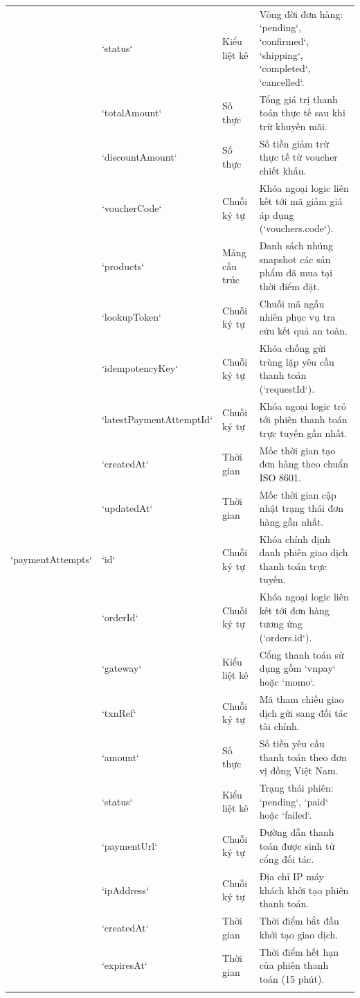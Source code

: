 \begin{table}[H]
\begin{tabularx}{\textwidth}{p{2.5cm}p{2.3cm}p{1.8cm}X}
& `status` & Kiểu liệt kê & Vòng đời đơn hàng: `pending`, `confirmed`, `shipping`, `completed`, `cancelled`. \\
& `totalAmount` & Số thực & Tổng giá trị thanh toán thực tế sau khi trừ khuyến mãi. \\
& `discountAmount` & Số thực & Số tiền giảm trừ thực tế từ voucher chiết khấu. \\
& `voucherCode` & Chuỗi ký tự & Khóa ngoại logic liên kết tới mã giảm giá áp dụng (`vouchers.code`). \\
& `products` & Mảng cấu trúc & Danh sách nhúng snapshot các sản phẩm đã mua tại thời điểm đặt. \\
& `lookupToken` & Chuỗi ký tự & Chuỗi mã ngẫu nhiên phục vụ tra cứu kết quả an toàn. \\
& `idempotencyKey` & Chuỗi ký tự & Khóa chống gửi trùng lặp yêu cầu thanh toán (`requestId`). \\
& `latestPaymentAttemptId` & Chuỗi ký tự & Khóa ngoại logic trỏ tới phiên thanh toán trực tuyến gần nhất. \\
& `createdAt` & Thời gian & Mốc thời gian tạo đơn hàng theo chuẩn ISO 8601. \\
& `updatedAt` & Thời gian & Mốc thời gian cập nhật trạng thái đơn hàng gần nhất. \\
\addlinespace
`paymentAttempts` & `id` & Chuỗi ký tự & Khóa chính định danh phiên giao dịch thanh toán trực tuyến. \\
& `orderId` & Chuỗi ký tự & Khóa ngoại logic liên kết tới đơn hàng tương ứng (`orders.id`). \\
& `gateway` & Kiểu liệt kê & Cổng thanh toán sử dụng gồm `vnpay` hoặc `momo`. \\
& `txnRef` & Chuỗi ký tự & Mã tham chiếu giao dịch gửi sang đối tác tài chính. \\
& `amount` & Số thực & Số tiền yêu cầu thanh toán theo đơn vị đồng Việt Nam. \\
& `status` & Kiểu liệt kê & Trạng thái phiên: `pending`, `paid` hoặc `failed`. \\
& `paymentUrl` & Chuỗi ký tự & Đường dẫn thanh toán được sinh từ cổng đối tác. \\
& `ipAddress` & Chuỗi ký tự & Địa chỉ IP máy khách khởi tạo phiên thanh toán. \\
& `createdAt` & Thời gian & Thời điểm bắt đầu khởi tạo giao dịch. \\
& `expiresAt` & Thời gian & Thời điểm hết hạn của phiên thanh toán (15 phút). \\
\addlinespace

\end{tabularx}
\end{table}
